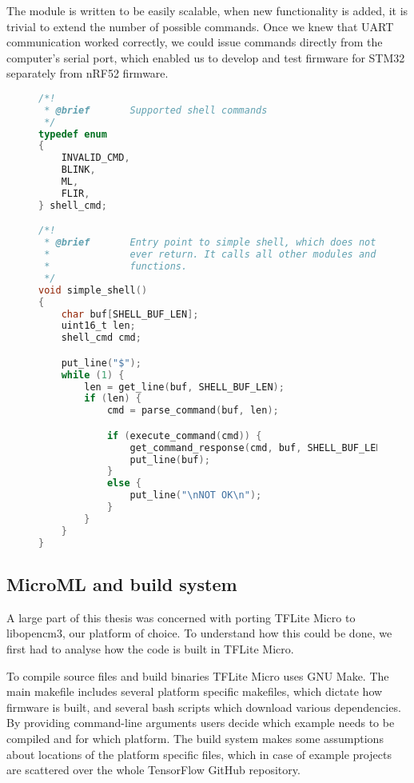 The module is written to be easily scalable, when new functionality is added, it is trivial to extend the number of possible commands.
Once we knew that UART communication worked correctly, we could issue commands directly from the computer's serial port, which enabled us to develop and test firmware for STM32 separately from nRF52 firmware.
\clearpage
\lstset{style=mystyle}
\begin{figure}[ht]
\begin{lstlisting}[language=C]
/*!
 * @brief       Supported shell commands
 */
typedef enum 
{
    INVALID_CMD,
    BLINK,
    ML,
    FLIR,
} shell_cmd; 

/*!
 * @brief       Entry point to simple shell, which does not
 *              ever return. It calls all other modules and 
 *              functions.
 */
void simple_shell()
{
    char buf[SHELL_BUF_LEN];
    uint16_t len;
    shell_cmd cmd;

    put_line("$");
    while (1) {
        len = get_line(buf, SHELL_BUF_LEN);
        if (len) {
            cmd = parse_command(buf, len);

            if (execute_command(cmd)) {
                get_command_response(cmd, buf, SHELL_BUF_LEN);
                put_line(buf);
            }
            else {
                put_line("\nNOT OK\n");
            }
        }
    }
}
\end{lstlisting}
\label{simple_shell_code}
\end{figure}


\subsection{ MicroML and build system} \label{build_system_label}

A large part of this thesis was concerned with porting TFLite Micro to libopencm3, our platform of choice.
To understand how this could be done, we first had to analyse how the code is built in TFLite Micro.

To compile source files and build binaries TFLite Micro uses GNU Make.
The main makefile includes several platform specific makefiles, which dictate how firmware is built, and several bash scripts which download various dependencies.
By providing command-line arguments users decide which example needs to be compiled and for which platform.
The build system makes some assumptions about locations of the platform specific files, which in case of example projects are scattered over the whole TensorFlow GitHub repository.

